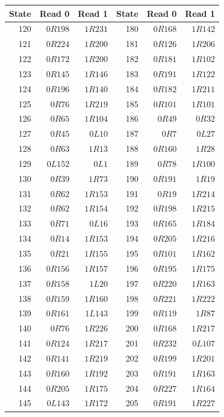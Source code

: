 \begin{center}
\begin{tabular}{@{}rrr@{\hspace{0.75in}}rrr@{}}
\toprule
State & Read 0 & Read 1 & State & Read 0 & Read 1\\
\midrule
120 & $0R198$ & $1R231$ & 180 & $0R168$ & $1R142$\\
121 & $0R224$ & $1R200$ & 181 & $0R126$ & $1R206$\\
122 & $0R172$ & $1R200$ & 182 & $0R181$ & $1R102$\\
123 & $0R145$ & $1R146$ & 183 & $0R191$ & $1R122$\\
124 & $0R196$ & $1R140$ & 184 & $0R182$ & $1R211$\\
125 & $0R76$ & $1R219$ & 185 & $0R101$ & $1R101$\\
126 & $0R65$ & $1R104$ & 186 & $0R49$ & $0R32$\\
127 & $0R45$ & $0L10$ & 187 & $0R7$ & $0L27$\\
128 & $0R63$ & $1R13$ & 188 & $0R160$ & $1R28$\\
129 & $0L152$ & $0L1$ & 189 & $0R78$ & $1R100$\\
130 & $0R39$ & $1R73$ & 190 & $0R191$ & $1R19$\\
131 & $0R62$ & $1R153$ & 191 & $0R19$ & $1R214$\\
132 & $0R62$ & $1R154$ & 192 & $0R198$ & $1R215$\\
133 & $0R71$ & $0L16$ & 193 & $0R165$ & $1R184$\\
134 & $0R14$ & $1R153$ & 194 & $0R205$ & $1R216$\\
135 & $0R21$ & $1R155$ & 195 & $0R101$ & $1R162$\\
136 & $0R156$ & $1R157$ & 196 & $0R195$ & $1R175$\\
137 & $0R158$ & $1L20$ & 197 & $0R220$ & $1R163$\\
138 & $0R159$ & $1R160$ & 198 & $0R221$ & $1R222$\\
139 & $0R161$ & $1L143$ & 199 & $0R119$ & $1R87$\\
140 & $0R76$ & $1R226$ & 200 & $0R168$ & $1R217$\\
141 & $0R124$ & $1R217$ & 201 & $0R232$ & $0L107$\\
142 & $0R141$ & $1R219$ & 202 & $0R199$ & $1R201$\\
143 & $0R160$ & $1R192$ & 203 & $0R191$ & $1R163$\\
144 & $0R205$ & $1R175$ & 204 & $0R227$ & $1R164$\\
145 & $0L143$ & $1R172$ & 205 & $0R191$ & $1R227$\\

\end{tabular}
\end{center}
